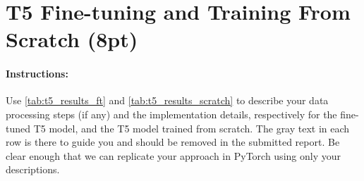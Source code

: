 \documentclass{article}
\begin{document}



\newpage




\section{T5 Fine-tuning and Training From Scratch (8pt)}\label{sec:t5}
\paragraph{Instructions:} Use \autoref{tab:t5_results_ft} and \autoref{tab:t5_results_scratch} to describe your data processing steps (if any) and the implementation details, respectively for the fine-tuned T5 model, and the T5 model trained from scratch.
The gray text in each row is there to guide you and should be removed in the submitted report. 
Be clear enough that we can replicate your approach in PyTorch using only your descriptions.
\end{document}
